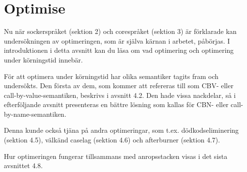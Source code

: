 \documentclass[Rapport]{subfiles}
\begin{document}
\section{Optimise}
\label{sec:Optimise}

\overviewOptimise

Nu när sockerspråket (sektion 2) och corespråket (sektion 3) är förklarade
kan undersökningen av optimeringen, som är själva kärnan i arbetet, påbörjas.
I introduktionen i detta avsnitt kan du läsa om vad optimering och 
optimering under körningstid innebär. 

För att optimera under körningstid har olika semantiker tagits fram och undersökts.   
Den första av dem, som kommer att refereras till som CBV- eller call-by-value-semantiken, 
beskrivs i avsnitt 4.2. Den hade vissa nackdelar, så i 
efterföljande avsnitt presenteras en bättre lösning som kallas för CBN- eller call-by-name-semantiken.

Denna kunde också tjäna på andra optimeringar, som t.ex.
dödkodseliminering (sektion 4.5), 
välkänd caselag (sektion 4.6) och 
afterburner (sektion 4.7).

Hur optimeringen fungerar tillsammans med anropsstacken visas i det sista avsnittet 4.8.


\end{document}
